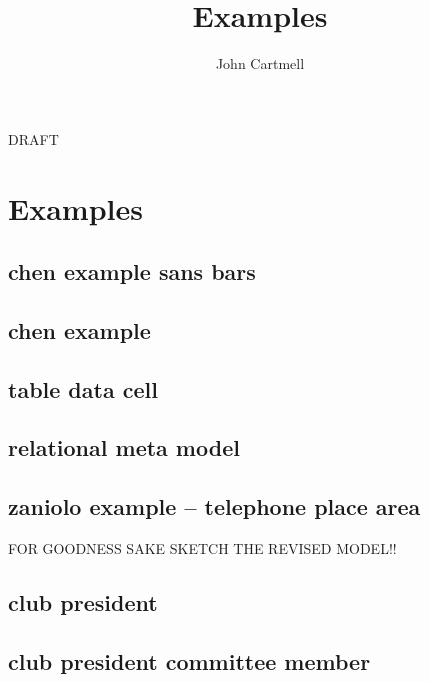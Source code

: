 \documentclass[10pt,a4paper]{article}
\begin{document}
\title{Examples}


\author{John Cartmell}

\maketitle
\begin{center}
DRAFT
\end{center}

\appendix
\section{Examples}


\subsection{chen example sans bars}


\subsection{chen example}


\subsection{table data cell}


\subsection{relational meta model}


\subsection{zaniolo example -- telephone place area}

FOR GOODNESS SAKE SKETCH THE REVISED MODEL!!

\subsection{club president}


\subsection{club president committee member}

\end{document}
